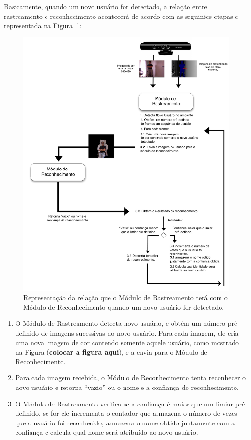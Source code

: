 	Basicamente, quando um novo usuário for detectado, a relação entre rastreamento e reconhecimento acontecerá de acordo com as seguintes etapas e representada na Figura~\ref{fig:rastreamento-reconhecimento}:

		\begin{figure}[hbt]
			\begin{center}
				\includegraphics[scale=1.5]{figuras/4.ProblemaEProposta/esquema-tracker-reco.png}
			\end{center}
			\caption{Representação da relação que o Módulo de Rastreamento terá com o Módulo de Reconhecimento quando um novo usuário for detectado.}
			\label{fig:rastreamento-reconhecimento}
		\end{figure}
	
		\begin{enumerate}
		 	\item O Módulo de Rastreamento detecta novo usuário, e obtém um número pré-definido de imagens sucessivas do novo usuário. Para cada imagem, ele cria uma nova imagem de cor contendo somente aquele usuário, como mostrado na Figura (\textbf{colocar a figura aqui}), e a envia para o Módulo de Reconhecimento.
		 	\item Para cada imagem recebida, o Módulo de Reconhecimento tenta reconhecer o novo usuário e retorna ``vazio'' ou o nome e a confiança do reconhecimento.
		 	\item O Módulo de Rastreamento verifica se a confiança é maior que um limiar pré-definido, se for ele incrementa o contador que armazena o número de vezes que o usuário foi reconhecido, armazena o nome obtido juntamente com a confiança e calcula qual nome será atribuído ao novo usuário.
	 	\end{enumerate} 
	
